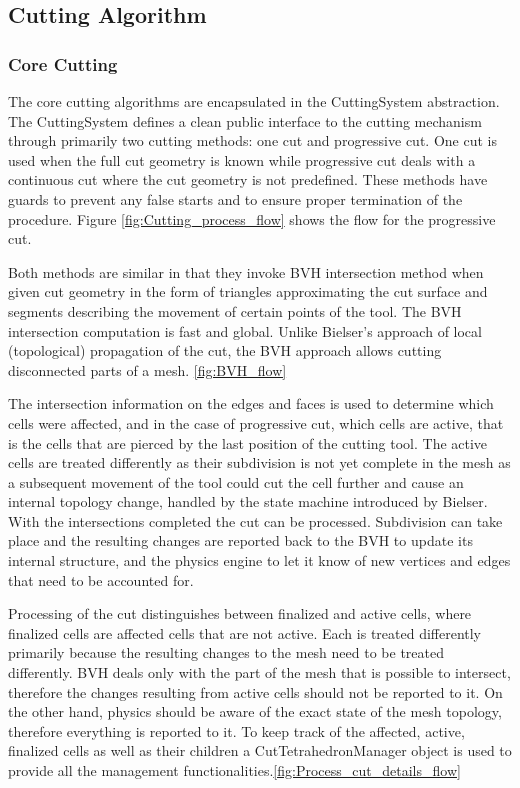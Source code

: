 \subsection{Cutting Algorithm}
\subsubsection{Core Cutting}

The core cutting algorithms are encapsulated in the CuttingSystem abstraction. The CuttingSystem defines a clean public interface to the cutting mechanism through primarily two cutting methods: one cut and progressive cut. One cut is used when the full cut geometry is known while progressive cut deals with a continuous cut where the cut geometry is not predefined. These methods have guards to prevent any false starts and to ensure proper termination of the procedure. Figure \ref{fig:Cutting_process_flow} shows the flow for the progressive cut.

Both methods are similar in that they invoke BVH intersection method when given cut geometry in the form of triangles approximating the cut surface and segments describing the movement of certain points of the tool. The BVH intersection computation is fast and global. Unlike Bielser’s approach of local (topological) propagation of the cut, the BVH approach allows cutting disconnected parts of a mesh. \ref{fig:BVH_flow}

The intersection information on the edges and faces is used to determine which cells were affected, and in the case of progressive cut, which cells are active, that is the cells that are pierced by the last position of the cutting tool. The active cells are treated differently as their subdivision is not yet complete in the mesh as a subsequent movement of the tool could cut the cell further and cause an internal topology change, handled by the state machine introduced by Bielser. With the intersections completed the cut can be processed. Subdivision can take place and the resulting changes are reported back to the BVH to update its internal structure, and the physics engine to let it know of new vertices and edges that need to be accounted for.

Processing of the cut distinguishes between finalized and active cells, where finalized cells are affected cells that are not active. Each is treated differently primarily because the resulting changes to the mesh need to be treated differently. BVH deals only with the part of the mesh that is possible to intersect, therefore the changes resulting from active cells should not be reported to it. On the other hand, physics should be aware of the exact state of the mesh topology, therefore everything is reported to it. To keep track of the affected, active, finalized cells as well as their children a CutTetrahedronManager object is used to provide all the management functionalities.\ref{fig:Process_cut_details_flow}

